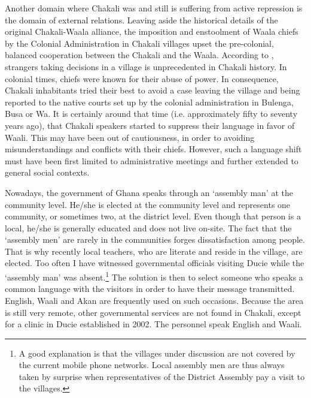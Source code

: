 Another domain where Chakali was and still is  suffering from active repression
is the domain of  external relations.  Leaving aside the
historical details of the original Chakali-Waala alliance, the imposition and
enstoolment of Waala chiefs by the Colonial Administration in Chakali villages
upset the pre-colonial, balanced cooperation between the Chakali and the Waala.
According to \citet[]{Daan94}, strangers taking decisions in a village is
unprecedented in Chakali history. In colonial times,
chiefs were known for their abuse of  power. In consequence, Chakali
inhabitants
tried their best to avoid  a case leaving the village and being reported
to the native courts set up by the colonial administration  in Bulenga,   Busa
or Wa.  It is certainly around
that time (i.e. approximately fifty to seventy years ago), that Chakali speakers started
to suppress their language in favor of Waali. This may have been out of cautiousness, in order to avoiding misunderstandings and conflicts with their chiefs. However, such a language shift must have been first
limited to administrative meetings and further extended to general social
contexts.  


Nowadays, the government of Ghana speaks through an `assembly man' at the
community level.
He/she  is elected at the community level and  represents one community,
or sometimes two,  at the district level.  Even though that person is a local,   he/she is generally educated and does not live
on-site.  The fact that the `assembly men' are rarely in the communities forges dissatisfaction among people. That is why  recently local teachers, who are
literate and reside in the
village,  are elected. Too often I have witnessed governmental officials visiting Ducie while
the `assembly man' was absent.\footnote{A good explanation is that the villages
under
discussion are not covered by the current mobile phone networks. Local
 assembly men are thus always taken by surprise when representatives of the  District Assembly pay
a
visit to the villages.} The solution is then to select someone who speaks a
common language with the visitors in order to have their message transmitted.
English, Waali and Akan are frequently used on such  occasions. Because the area
is still very remote, other governmental services are not found in Chakali,
except for a clinic in Ducie established in 2002. The personnel speak English
and Waali. 



